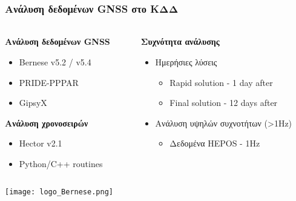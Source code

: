 \graphicspath{{R250215/Figs/}}

\begin{frame}
  \frametitle{Ανάλυση δεδομένων GNSS στο ΚΔΔ}
  \framesubtitle{}
  \label{}
  \begin{columns}[T]
    \begin{column}{.5\textwidth}
    \textbf{Ανάλυση δεδομένων GNSS}
      \begin{itemize}\setlength\itemsep{1em}
         \item Bernese v5.2 / v5.4 \citep{Bernese}
         \item PRIDE-PPPAR \citep{PRIDE}
         \item GipsyX \citep{GipsyX}
       \end{itemize} 
    \textbf{Ανάλυση χρονοσειρών}
    \begin{itemize}\setlength\itemsep{1em}
      \item Hector v2.1 \citep{Bos2012}
      \item Python/C++ routines
    \end{itemize}
    \end{column}
    \begin{column}{.5\textwidth}
      \textbf{Συχνότητα ανάλυσης}
      \begin{itemize}\setlength\itemsep{1em}
        \item Ημερήσιες λύσεις
          \begin{itemize}\setlength\itemsep{1em}
            \item Rapid solution - 1 day after
            \item Final solution - 12 days after
          \end{itemize}
        \item Ανάλυση υψηλών συχνοτήτων (>1Hz)
          \begin{itemize}\setlength\itemsep{1em}
            \item Δεδομένα HEPOS - 1Hz
          \end{itemize}
      \end{itemize}
    \end{column}
  \end{columns}
  \begin{columns}[T]
    \begin{column}{.1\textwidth}
      \begin{center}
        \texttt{[image: logo\_Bernese.png]}
      \end{center}

\end{column}
\end{columns}
\end{frame}
